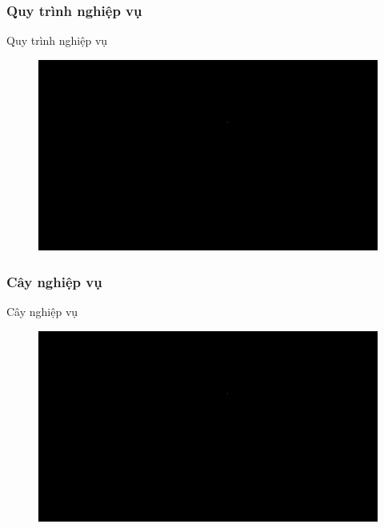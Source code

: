 \documentclass{beamer}
\begin{document}
\subsubsection{Quy trình nghiệp vụ}

\begin{frame}{Quy trình nghiệp vụ}
\begin{figure}[H]
\centering
\includegraphics[scale = 0.3]{pictures/black.png}
\end{figure}
\end{frame}

\subsubsection{Cây nghiệp vụ}
\begin{frame}{Cây nghiệp vụ}
\begin{figure}[H]
\centering
\includegraphics[scale = 0.3]{pictures/black.png}
\end{figure}
\end{frame}
\end{document}

